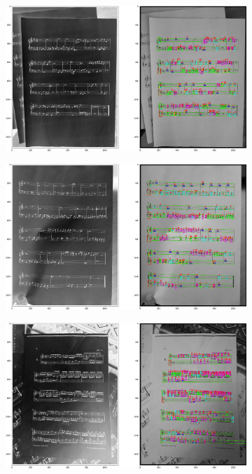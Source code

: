\documentclass[12pt]{article}
\begin{document}
\begin{enumerate}
\begin{figure}[h!]
				\begin{subfigure}[b]{0.48\linewidth}
					\includegraphics[width=\linewidth]{Medium/Zdj23.png}
				\end{subfigure}
				\begin{subfigure}[b]{0.48\linewidth}
					\includegraphics[width=\linewidth]{Medium/Zdj24.png}
				\end{subfigure}
				\begin{subfigure}[b]{0.48\linewidth}
					\includegraphics[width=\linewidth]{Medium/Zdj25.png}

\end{subfigure}
\end{figure}
\end{enumerate}
\end{document}
